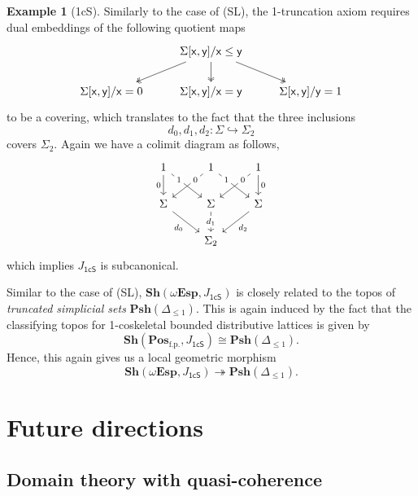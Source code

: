 \documentclass[a4paper,12pt]{amsart}
\theoremstyle{definition}
\newtheorem{example}[theorem]{Example}
\newcommand{\mb}[1]{\mathbf{#1}}
\newcommand{\mr}[1]{\mathrm{#1}}
\newcommand{\ms}[1]{\mathsf{#1}}
\newcommand{\Pos}{\mb{Pos}}
\newcommand{\sh}{\mb{Sh}}
\newcommand{\psh}{\mb{Psh}}
\newcommand{\surj}{\twoheadrightarrow}
\newcommand{\hook}{\hookrightarrow}
\newcommand{\fp}{_{\mr{f.p.}}}
\newcommand{\wTop}{\omega\mb{Esp}}
\begin{document}
\begin{example}[1cS]\label{exm:model1T}
  Similarly to the case of (SL), the 1-truncation axiom requires dual embeddings of the following quotient maps
  \[\begin{tikzcd}
    & {\Sigma[\ms{x},\ms{y}]/\ms{x}\le\ms{y}} \\
    {\Sigma[\ms{x},\ms{y}]/\ms{x}=0} & {\Sigma[\ms{x},\ms{y}]/\ms{x}=\ms{y}} & {\Sigma[\ms{x},\ms{y}]/\ms{y}=1}
    \arrow[two heads, from=1-2, to=2-1]
    \arrow[two heads, from=1-2, to=2-2]
    \arrow[two heads, from=1-2, to=2-3]
  \end{tikzcd}\]
  to be a covering, which translates to the fact that the three inclusions
  \[ d_0,d_1,d_2 : \Sigma \hook \Sigma_2 \]
  covers $\Sigma_2$. Again we have a colimit diagram as follows, 
  \[\begin{tikzcd}
    1 & 1 & 1 \\
    \Sigma & \Sigma & \Sigma \\
    & {\Sigma_2}
    \arrow["0"', from=1-1, to=2-1]
    \arrow["1"{description, pos=0.25}, from=1-1, to=2-2]
    \arrow["0"{description, pos=0.25}, from=1-2, to=2-1]
    \arrow["1"{description, pos=0.25}, from=1-2, to=2-3]
    \arrow["0"{description, pos=0.25}, from=1-3, to=2-2]
    \arrow["0", from=1-3, to=2-3]
    \arrow["{d_0}"', from=2-1, to=3-2]
    \arrow["{d_1}"{description}, from=2-2, to=3-2]
    \arrow["{d_2}", from=2-3, to=3-2]
  \end{tikzcd}\]
  which implies $J_{\ms{1cS}}$ is subcanonical.
  
  Similar to the case of (SL), $\sh(\wTop,J_{\ms{1cS}})$ is closely related to the topos of \emph{truncated simplicial sets} $\psh(\Delta_{\le 1})$. This is again induced by the fact that the classifying topos for 1-coskeletal bounded distributive lattices is given by 
  \[ \sh(\Pos\fp,J_{\ms{1cS}}) \cong \psh(\Delta_{\le 1})\text{.} \]
  Hence, this again gives us a local geometric morphism
  \[ \sh(\wTop,J_{\ms{1cS}}) \surj \psh(\Delta_{\le 1})\text{.} \]
\end{example}


\section{Future directions}

\subsection{Domain theory with quasi-coherence}
\end{document}
